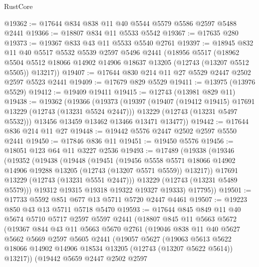 \begin{lexlean}{RustCore}
\begin{coremodule}
@19362 := @17644 @834 @838 @11 @40 @5544 @5579 @5586 @2597 @5488 @2441
@19366 := @18807 @834 @11 @5533 @5542
@19367 := @17635 @280
@19373 := @19367 @833 @43 @11 @5533 @5540 @2761
@19397 := @18945
    @832
    @11
    @40
    @5517
    @5532
    @5539
    @2597
    @5496
    @2441
    (@18956
      @5517
      (@18962 @5504 @5512 @18066 @14902 @14906 @18637 @13205 (@12743 (@13207 @5512 @5505)) @13217))
@19407 := @17644 @830 @214 @11 @27 @5529 @2447 @2502 @2597 @5523 @2441
@19409 := @17679 @829 @5529
@19411 := @13975 (@13976 @5529)
@19412 := @19409 @19411
@19415 := @12743 (@13981 @829 @11)
@19438 := @19362
    (@19366
      (@19373
        (@19397
          (@19407 (@19412 @19415) @17691 @13229 (@12743 (@13231 @5524 @2447)))
          @13229
          (@12743 (@13231 @5497 @5532)))
        @13456
        @13459
        @13462
        @13466
        @13471
        @13477))
@19442 := @17644 @836 @214 @11 @27
@19448 := @19442 @5576 @2447 @2502 @2597 @5550 @2441
@19450 := @17846 @836 @11
@19451 := @19450 @5576
@19456 := @18051 @123 @64 @11 @3227 @2536
@19493 := @17489
    (@19338
      (@19346
        (@19352
          (@19438
            (@19448
              (@19451
                (@19456
                  @5558
                  @5571
                  @18066
                  @14902
                  @14906
                  @19288
                  @13205
                  (@12743 (@13207 @5571 @5559))
                  @13217))
              @17691
              @13229
              (@12743 (@13231 @5551 @2447)))
            @13229
            (@12743 (@13231 @5489 @5579)))
          @19312
          @19315
          @19318
          @19322
          @19327
          @19333)
        @17795))
@19501 := @17733 @5592 @851 @677 @13 @5711 @5720 @2447 @4461
@19507 := @19223 @850 @43 @13 @5711 @5718 @5470
@19593 := @17644
    @845
    @849
    @11
    @40
    @5674
    @5710
    @5717
    @2597
    @5597
    @2441
    (@18807
      @845
      @11
      @5663
      @5672
      (@19367
        @844
        @43
        @11
        @5663
        @5670
        @2761
        (@19046
          @838
          @11
          @40
          @5627
          @5662
          @5669
          @2597
          @5605
          @2441
          (@19057
            @5627
            (@19063
              @5613
              @5622
              @18066
              @14902
              @14906
              @18534
              @13205
              (@12743 (@13207 @5622 @5614))
              @13217))
          (@19442
            @5659
            @2447
            @2502
            @2597

\end{coremodule}
\end{lexlean}
